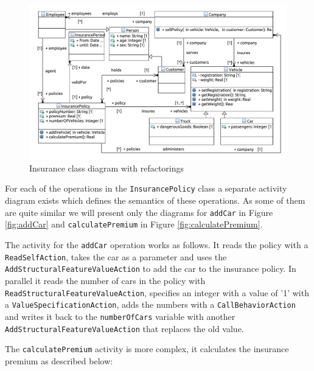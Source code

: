 \documentclass{llncs}
\begin{document}
\begin{figure}[h!t]
 \centering
 \includegraphics[scale=0.5]{images/insurance_ref/Model_Model_ClassDiagram}
 \caption{Insurance class diagram with refactorings}
 \label{fig:classdiagramcomplexRef}
\end{figure}

For each of the operations in the \texttt{InsurancePolicy} class a separate activity diagram exists which defines the semantics 
of these operations. As some of them are quite similar we will present only the diagrams for \texttt{addCar} in Figure 
\ref{fig:addCar} and \texttt{calculatePremium} in  Figure \ref{fig:calculatePremium}.

The activity for the \texttt{addCar} operation works as follows. It reads the policy with a \texttt{Read\-Self\-Action}, takes the 
car as a parameter and uses the \texttt{Add\-Structural\-Feature\-Value\-Action} to add the car to the insurance policy. In parallel 
it reads the number of cars in the policy with \texttt{Read\-Structural\-Feature\-Value\-Action}, specifies an integer
with a value of '1' with 
a \texttt{Value\-Specification\-Action}, adds the numbers with a \texttt{Call\-Behavior\-Action} and writes it back to the 
\texttt{numberOfCars} variable with another \texttt{Add\-Structural\-Feature\-Value\-Action} that replaces the old value.

The \texttt{calculatePremium} activity is more complex, it calculates the insurance premium as described below:
\end{document}
